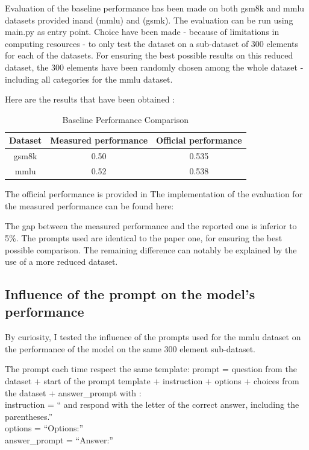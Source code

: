 \documentclass{article}
\begin{document}
    Evaluation of the baseline performance has been made on both gsm8k and mmlu datasets provided in\cite{hendryckstest2021}and\cite{hendrycks2021ethics} (mmlu) and\cite{cobbe2021gsm8k} (gsmk).
    The evaluation can be run using main.py as entry point.
    Choice have been made - because of limitations in computing resources - to only test the dataset on a sub-dataset of 300 elements for each of the datasets.
    For ensuring the best possible results on this reduced dataset, the 300 elements have been randomly chosen among the whole dataset - including all categories for the mmlu dataset.

    Here are the results that have been obtained :
    \begin{table}[H]
        \centering
        \begin{tabular}{|c|c|c|}
            \hline
            \textbf{Dataset} & \textbf{Measured performance} & \textbf{Official performance} \\
            \hline
            gsm8k  & 0.50 & 0.535 \\
            \hline
            mmlu& 0.52 & 0.538 \\
            \hline
        \end{tabular}
        \caption{Baseline Performance Comparison}
        \label{tab:baseline-performance}
    \end{table}

    The official performance is provided in\cite{hu2024minicpm}
    The implementation of the evaluation for the measured performance can be found here:\cite{he2024ultraeval}

    The gap between the measured performance and the reported one is inferior to 5\%.
    The prompts used are identical to the paper one, for ensuring the best possible comparison.
    The remaining difference can notably be explained by the use of a more reduced dataset. 

    \subsection{Influence of the prompt on the model's performance}\label{subsec:influence-of-the-prompt-on-the-model's-performance}

    By curiosity, I tested the influence of the prompts used for the mmlu dataset on the performance of the model on the same 300 element sub-dataset.

    The prompt each time respect the same template:
    prompt = question from the dataset + start of the prompt template + instruction + options + choices from the dataset + answer\_prompt
    with : \\
    instruction = `` and respond with the letter of the correct answer, including the parentheses.''\\
    options = ``Options:''\\
    answer\_prompt = ``Answer:'' \\
\end{document}
